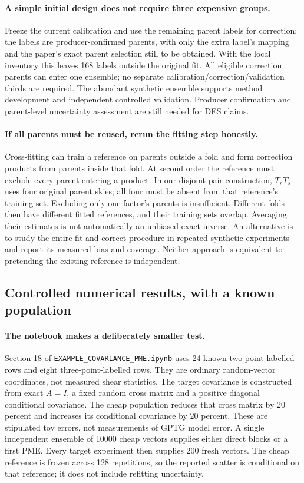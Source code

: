 \documentclass[11pt]{article}
\begin{document}
\paragraph{A simple initial design does not require three expensive groups.}
Freeze the current calibration and use the remaining parent labels for
correction; the labels are producer-confirmed parents, with only the extra
label's mapping and the paper's exact parent selection still to be
obtained. With the local inventory
this leaves 168 labels outside the original fit. All eligible correction
parents can enter one ensemble; no separate calibration/correction/validation
thirds are required. The abundant synthetic ensemble supports method
development and independent controlled validation. Producer confirmation
and parent-level uncertainty assessment are still needed for DES claims.

\paragraph{If all parents must be reused, rerun the fitting step honestly.}
Cross-fitting can train a reference on parents outside a fold and form
correction products from parents inside that fold. At second order the
reference must exclude every parent entering a product. In our disjoint-pair
construction, $T_rT_s$ uses four original parent skies; all four must be
absent from that reference's training set. Excluding only one factor's
parents is insufficient.
Different folds then have different fitted references, and their training
sets overlap. Averaging their estimates is not automatically an unbiased
exact inverse. An alternative is to study the entire fit-and-correct
procedure in repeated synthetic experiments and report its measured bias
and coverage. Neither approach is equivalent to pretending the existing
reference is independent.

\subsection{Controlled numerical results, with a known population}

\paragraph{The notebook makes a deliberately smaller test.}
Section 18 of \nolinkurl{EXAMPLE_COVARIANCE_PME.ipynb} uses 24 known
two-point-labelled rows and eight three-point-labelled rows. They are
ordinary random-vector coordinates, not measured shear statistics.
The target covariance is constructed from exact $A=I$, a fixed random
cross matrix and a positive diagonal conditional covariance. The cheap
population reduces that cross matrix by 20 percent and increases its
conditional covariance by 20 percent. These are stipulated toy errors,
not measurements of GPTG model error. A single independent ensemble of
10000 cheap vectors supplies either direct blocks or a first PME.
Every target experiment then supplies 200 fresh vectors. The cheap
reference is frozen across 128 repetitions, so the reported scatter is
conditional on that reference; it does not include refitting uncertainty.
\end{document}
